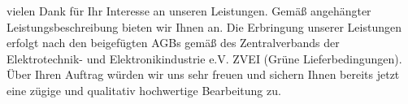 
vielen Dank für Ihr Interesse an unseren Leistungen. Gemäß angehängter Leistungsbeschreibung bieten wir Ihnen an. \newline
Die Erbringung unserer Leistungen erfolgt nach den beigefügten AGBs gemäß des Zentralverbands der Elektrotechnik- und Elektronikindustrie e.V. ZVEI (Grüne Lieferbedingungen).\newline
Über Ihren Auftrag würden wir uns sehr freuen und sichern Ihnen bereits jetzt eine zügige und qualitativ hochwertige Bearbeitung zu. 
